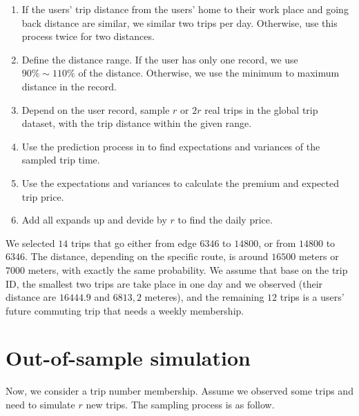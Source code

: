 \documentclass[12pt]{article}
\begin{document}
{{{{{{\begin{appendices}
\begin{enumerate}
    \item If the users' trip distance from the users' home to their work place and going back distance are similar, we similar two trips per day. Otherwise, use this process twice for two distances.
    \item Define the distance range. If the user has only one record, we use $90\%\sim110\%$ of the distance. Otherwise, we use the minimum to maximum distance in the record.
    \item Depend on the user record, sample $r$ or $2r$ real trips in the global trip dataset, with the trip distance within the given range.
    \item Use the prediction process in \cite{elmasri2020predictive} to find expectations and variances of the sampled trip time.
    \item Use the expectations and variances to calculate the premium and expected trip price.
    \item Add all expands up and devide by $r$ to find the daily price.
\end{enumerate}


We selected $14$ trips that go either from edge $6346$ to $14800$, or from $14800$ to $6346$. The distance, depending on the specific route, is around $16500$ meters or $7000$ meters, with exactly the same probability. We assume that base on the trip ID, the smallest two trips are take place in one day and we observed (their distance are $16444.9$ and $6813,2$ meteres), and the remaining $12$ trips is a users' future commuting trip that needs a weekly membership. 



\section{Out-of-sample simulation}
 Now, we consider a trip number membership. Assume we observed some trips and need to simulate $r$ new trips. The sampling process is as follow.

\begin{enumerate}


\end{enumerate}
\end{appendices}}}}}}}
\end{document}
